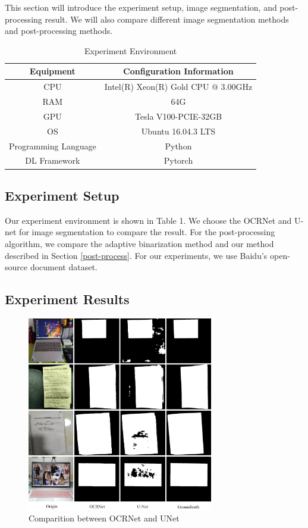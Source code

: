 \documentclass[10pt, conference, compsocconf]{IEEEtran}
\begin{document}
This section will introduce the experiment setup, image segmentation, and post-processing result. We will also compare different image segmentation methods and post-processing methods. 

\begin{table}
	\caption{Experiment Environment}
	\begin{tabular}{cc}
		\hline Equipment & Configuration Information \\
		\hline CPU & Intel(R) Xeon(R) Gold CPU @ 3.00GHz \\
		 RAM & 64G \\
		 GPU & Tesla V100-PCIE-32GB \\
		 OS & Ubuntu 16.04.3 LTS \\
		 Programming Language & Python \\
		 DL Framework & Pytorch \\
		\hline
	\end{tabular}
\end{table}

\subsection{Experiment Setup}


Our experiment environment is shown in Table 1. 
We choose the OCRNet\cite{yuan2020object} and U-net\cite{ronneberger2015u} for image segmentation to compare the result.
For the post-processing algorithm, we compare the adaptive binarization method and our method described in Section \ref{post-process}.
For our experiments, we use Baidu's open-source document dataset. 




\subsection{Experiment Results}

\begin{figure}[!t]
	\centering
	\label{figure:Comparition}
	\includegraphics[width=3.2in]{./Assets/final_whole_img.jpg}
	\caption{Comparition between OCRNet and UNet}
\end{figure}
	
\end{document}
